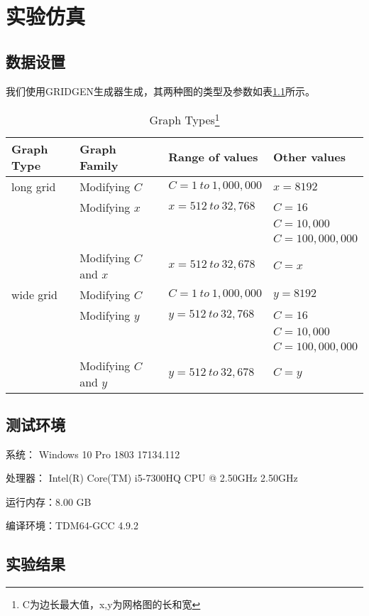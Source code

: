 \chapter{实验仿真}
\section{数据设置}
我们使用GRIDGEN生成器\cite{Cherkassky1994Shortest}生成，其两种图的类型及参数如表\ref{tab1}所示。

\begin{table}[H]
  \caption{Graph Types\protect\footnote[1]{C为边长最大值，x,y为网格图的长和宽}}
  \label{tab1}
  \centering
  \begin{tabular}{p{2.4cm}<{\centering}|p{3.4cm}<{\centering}||p{3.4cm}<{\centering}|p{3.4cm}<{\centering}}
  \toprule
   Graph Type  & Graph Family & Range of values & Other values\\
  \midrule
  long grid & Modifying $C$ & $C=1\ to\ 1,000,000$ & $x=8192$\\
   & Modifying $x$ & $x=512\ to\ 32,768$ & $C=16$ \\
   & & & $C=10,000$\\
   & & & $C=100,000,000$\\
   & Modifying $C$ and $x$ & $x=512\ to\ 32,678$ & $C=x$\\
   \midrule
  wide grid & Modifying $C$ & $C=1\ to\ 1,000,000$ & $y=8192$\\
   & Modifying $y$ & $y=512\ to\ 32,768$ & $C=16$ \\
   & & & $C=10,000$\\
   & & & $C=100,000,000$\\
   & Modifying $C$ and $y$ & $y=512\ to\ 32,678$ & $C=y$\\
  \bottomrule
  \end{tabular} 
\end{table}


\section{测试环境}
系统：    Windows 10 Pro 1803 17134.112 \par
处理器：  Intel(R) Core(TM) i5-7300HQ CPU @ 2.50GHz 2.50GHz \par
运行内存：8.00 GB \par
编译环境：TDM64-GCC 4.9.2
\section{实验结果}

